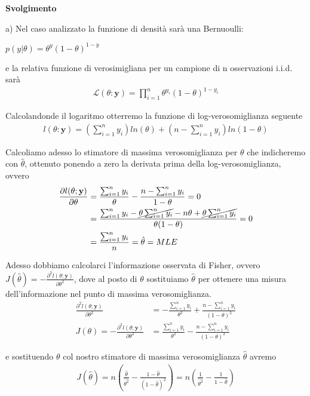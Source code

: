 \textbf{Svolgimento}
\\
\bigskip

a) Nel caso analizzato la funzione di densità sarà una Bernuoulli:
\begin{center}
$p(y|\theta)=\theta^{y}(1-\theta)^{1-y}$
\end{center}

e la relativa funzione di verosimigliana per un campione di n osservazioni i.i.d. sarà 
\begin{align*}
\mathcal{L}(\theta: \textbf{y})=\prod_{i=1}^n\theta^{y_i}(1-\theta)^{1-y_i}
\end{align*}

Calcolandonde il logaritmo otterremo la funzione di log-verosomiglianza seguente
\begin{align*}
l(\theta:\textbf{y})=\left(\sum_{i=1}^n y_{i}\right)ln(\theta)+\left(n-\sum_{i=1}^n y_{i}\right)ln(1-\theta)
\end{align*}

Calcoliamo adesso lo stimatore di massima verosomiglianza per $\theta$ che indicheremo con $\hat{\theta}$, ottenuto ponendo a zero la derivata prima della log-verosomiglianza, ovvero
\begin{align*}
\frac{\partial l(\theta;\textbf{y})}{\partial\theta}&=\frac{\sum_{i=1}^{n}y_i}{\theta}-\frac{n-\sum_{i=1}^{n}y_i}{1-\theta}= 0\\
&= \frac{\sum_{i=1}^{n}y_i -
\cancel{\theta\sum_{i=1}^{n}y_i} -
n\theta +
\cancel{\theta\sum_{i=1}^{n}y_i}}
{\theta(1-\theta)} = 0 \\
&=\frac{\sum_{i=1}^{n}y_i}{n} = \hat{\theta} = MLE
\end{align*}

Adesso dobbiamo calcolarci l'informazione osservata di Fisher, ovvero $J(\hat{\theta}) = -\frac{\partial^2 l(\theta;\textbf{y})}{\partial\theta^2}$, dove al posto di $\theta$ sostituiamo $\hat{\theta}$ per ottenere una misura dell'informazione nel punto di massima verosomiglianza.
\begin{align*}
\frac{\partial^2 l(\theta;\textbf{y})}{\partial\theta^2} &= -\frac{\sum_{i=1}^{n}y_i}{\theta^2}+\frac{n-\sum_{i=1}^{n}y_i}{(1-\theta)^2}\\
J(\theta) = -\frac{\partial^2 l(\theta;\textbf{y})}{\partial\theta^2} &= \frac{\sum_{i=1}^{n}y_i}{\theta^2}-\frac{n-\sum_{i=1}^{n}y_i}{(1-\theta)^2}
\end{align*}

e sostituendo $\theta$ col nostro stimatore di massima verosomiglianza $\hat{\theta}$ avremo
\begin{align*}
J(\hat{\theta}) = n\left(\frac{\hat{\theta}}{\hat{\theta^2}} - 
\frac{1- \hat{\theta}}{(1- \hat{\theta})^2}\right)
= n\left(\frac{1}{\hat{\theta^2}} -
\frac{ 1 }{1- \hat{\theta}}\right)
\end{align*}

